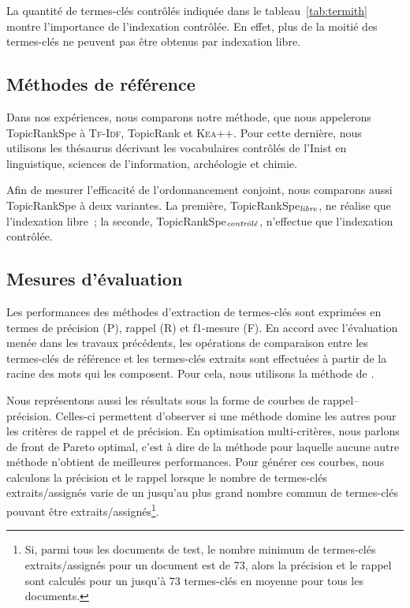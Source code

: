     La quantité de termes-clés contrôlés indiquée dans le
    tableau~\ref{tab:termith} montre l'importance de l'indexation contrôlée. En
    effet, plus de la moitié des termes-clés ne peuvent pas être obtenus par
    indexation libre.

  \subsection{Méthodes de référence}
  \label{subsec:main-domain_specific_keyphrase_annotation-supervised_automatic_keyphrase_annotation-evaluation-baselines}
    Dans nos expériences, nous comparons notre méthode, que nous appelerons
    TopicRankSpe à \textsc{Tf-Idf}, TopicRank et \textsc{Kea++}. Pour cette
    dernière, nous utilisons les thésaurus décrivant les vocabulaires contrôlés
    de l'Inist en linguistique, sciences de l'information, archéologie et chimie.

    Afin de mesurer l'efficacité de l'ordonnancement conjoint, nous comparons
    aussi TopicRankSpe à deux variantes. La première,
    TopicRankSpe$_\textnormal{\textit{libre}}$, ne réalise que l'indexation
    libre~; la seconde, TopicRankSpe$_\textnormal{\textit{contrôlé}}$, n'effectue
    que l'indexation contrôlée.
  
  \subsection{Mesures d'évaluation}
  \label{subsec:main-domain_specific_keyphrase_annotation-supervised_automatic_keyphrase_annotation-evaluation-evaluation_measures}
    Les performances des méthodes d'extraction de termes-clés sont exprimées
    en termes de précision (P), rappel (R) et f1-mesure (F). En
    accord avec l'évaluation menée dans les travaux précédents, les
    opérations de comparaison entre les termes-clés de référence et les
    termes-clés extraits sont effectuées à partir de la racine des mots qui
    les composent. Pour cela, nous utilisons la méthode de
    .

    Nous représentons aussi les résultats sous la forme de courbes de
    rappel--précision. Celles-ci permettent d'observer si une méthode domine
    les autres pour les critères de rappel et de précision. En optimisation
    multi-critères, nous parlons de front de Pareto optimal, c'est à dire de
    la méthode pour laquelle aucune autre méthode n'obtient de meilleures
    performances. Pour générer ces courbes, nous calculons la précision et
    le rappel lorsque  le nombre de termes-clés extraits/assignés varie de
    un jusqu'au plus grand nombre commun de termes-clés pouvant être
    extraits/assignés\footnote{Si, parmi tous les documents de test, le
    nombre minimum de termes-clés extraits/assignés pour un document est de
    73, alors la précision et le rappel sont calculés pour un jusqu'à 73
    termes-clés en moyenne pour tous les documents.}.
  
